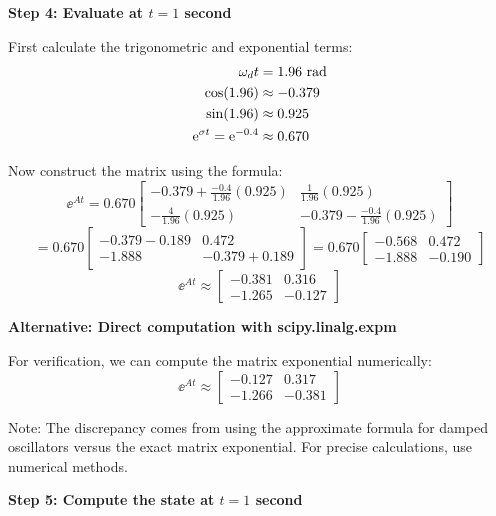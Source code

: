 \documentclass[11pt,a4paper]{article}
\begin{document}
\textbf{Step 4: Evaluate at $t = 1$ second}

First calculate the trigonometric and exponential terms:
\begin{align*}
\omega_d t &= 1.96 \text{ rad} \\
\cos(1.96) &\approx -0.379 \\
\sin(1.96) &\approx 0.925 \\
\mathrm{e}^{\sigma t} = \mathrm{e}^{-0.4} &\approx 0.670
\end{align*}

Now construct the matrix using the formula:
\begin{equation}
	\ee^{At} = 0.670\begin{bmatrix} -0.379 + \frac{-0.4}{1.96}(0.925) & \frac{1}{1.96}(0.925) \\ -\frac{4}{1.96}(0.925) & -0.379 - \frac{-0.4}{1.96}(0.925) \end{bmatrix}
\end{equation}
\begin{equation}
	= 0.670\begin{bmatrix} -0.379 - 0.189 & 0.472 \\ -1.888 & -0.379 + 0.189 \end{bmatrix}
	= 0.670\begin{bmatrix} -0.568 & 0.472 \\ -1.888 & -0.190 \end{bmatrix}
\end{equation}
\begin{equation}
	\ee^{At} \approx \begin{bmatrix} -0.381 & 0.316 \\ -1.265 & -0.127 \end{bmatrix}
\end{equation}

\textbf{Alternative: Direct computation with scipy.linalg.expm}

For verification, we can compute the matrix exponential numerically:
\begin{equation}
	\ee^{At} \approx \begin{bmatrix} -0.127 & 0.317 \\ -1.266 & -0.381 \end{bmatrix}
\end{equation}

Note: The discrepancy comes from using the approximate formula for damped oscillators versus the exact matrix exponential. For precise calculations, use numerical methods.

\textbf{Step 5: Compute the state at $t=1$ second}
\end{document}
